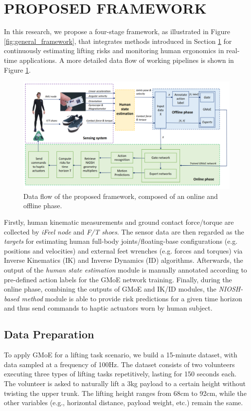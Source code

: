 \section{PROPOSED FRAMEWORK}
\label{sec:methods}
In this research, we propose a four-stage framework, as illustrated in Figure \ref{fig:general_framework}, that integrates methods introduced in Section \ref{sec:methods} for continuously estimating lifting risks and monitoring human ergonomics in real-time applications. A more detailed data flow of working pipelines is shown in Figure \ref{fig:pipelne_overview}.
\begin{figure}[htp]
   \centering
   \includegraphics[scale=0.18]{figures/fig_pipeline_overview.png}
   \caption{Data flow of the proposed framework, composed of an online and offline phase.}
   \label{fig:pipelne_overview}
\end{figure}

Firstly, human kinematic measurements and ground contact force/torque are collected by \emph{iFeel node} and \emph{F/T shoes}. The sensor data are then regarded as the \emph{targets} for estimating human full-body joints/floating-base configurations (e.g. positions and velocities) and external feet wrenches (e.g. forces and torques) via Inverse Kinematics (IK) and Inverse Dynamics (ID) algorithms. Afterwards, the output of the \emph{human state estimation} module is manually annotated according to pre-defined action labels for the GMoE network training. Finally, during the online phase, combining the outputs of GMoE and IK/ID modules, the \emph{NIOSH-based method} module is able to provide risk predictions for a given time horizon and thus send commands to haptic actuators worn by human subject.

\subsection{Data Preparation}
\label{subsec:make_data}
To apply GMoE for a lifting task scenario, we build a 15-minute dataset, with data sampled at a frequency of 100Hz. The dataset consists of two volunteers executing three types of lifting tasks repetitively, lasting for 150 seconds each. The volunteer is asked to naturally lift a 3kg payload to a certain height without twisting the upper trunk. The lifting height ranges from 68cm to 92cm, while the other variables (e.g., horizontal distance, payload weight, etc.) remain the same. 

